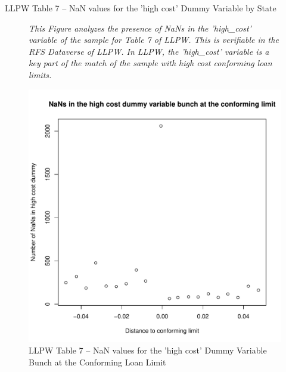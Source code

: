 \documentclass{article}
\begin{document}
\begin{table}
\caption{LLPW Table 7 -- NaN values for the 'high cost' Dummy Variable by State}
\begin{center}

\end{center}
    
\end{table}

\clearpage
\pagebreak

\begin{figure}
    
\caption{LLPW Table 7 -- NaN values for the 'high cost' Dummy Variable Bunch at the Conforming Loan Limit}

\emph{This Figure analyzes the presence of NaNs in the 'high\_cost' variable of the sample for Table 7 of LLPW. This is verifiable in the RFS Dataverse of LLPW. In LLPW, the 'high\_cost' variable is a key part of the match of the sample with high cost conforming loan limits.}

\begin{center}
\includegraphics[scale = 0.5]{02_evidence_of_data_errors_in_LPW_2024_Table_7/figures/nans_in_high_cost_dummy_bunching.pdf}
\end{center}

\end{figure}
\end{document}
